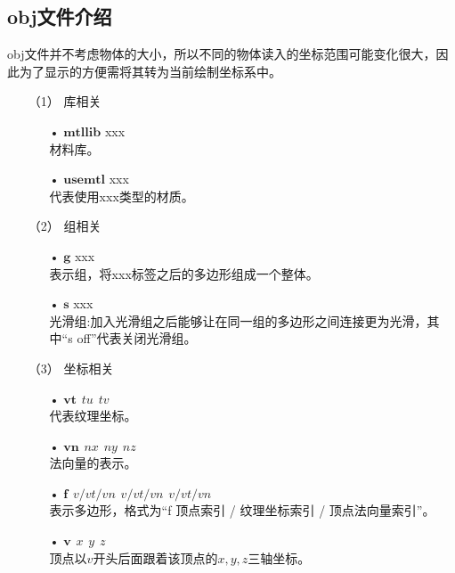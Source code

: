 \documentclass[10pt]{article}
\begin{document}
\subsection{obj文件介绍}
obj文件并不考虑物体的大小，所以不同的物体读入的坐标范围可能变化很大，因此为了显示的方便需将其转为当前绘制坐标系中。
\begin{itemize}
\item[（1）]{库相关}
\begin{itemize}
\item[•]{$\bm{mtllib}$ xxx} \mbox{} \\
材料库。
\item[•]{$\bm{usemtl}$ xxx} \mbox{} \\
代表使用xxx类型的材质。
\end{itemize}

\item[（2）]{组相关} 
\begin{itemize}
\item[•]{$\bm{g}$ xxx} \mbox{} \\
表示组，将xxx标签之后的多边形组成一个整体。
\item[•]{$\bm{s}$ xxx} \mbox{} \\
光滑组:加入光滑组之后能够让在同一组的多边形之间连接更为光滑，其中“s off”代表关闭光滑组。
\end{itemize}

\item[（3）]{坐标相关}
\begin{itemize}
\item[•]{$\bm{vt} \hspace{5pt}tu \hspace{5pt} tv$} \mbox{} \\
代表纹理坐标。
\item[•]{$\bm{vn} \hspace{5pt} nx \hspace{5pt} ny \hspace{5pt} nz$} \mbox{} \\
法向量的表示。
\item[•]{$\bm{f} \hspace{5pt} v/vt/vn \hspace{5pt} v/vt/vn \hspace{5pt} v/vt/vn$}\mbox{} \\
表示多边形，格式为“f 顶点索引 / 纹理坐标索引 / 顶点法向量索引”。
\item[•]{$\bm{v} \hspace{5pt} x\hspace{5pt}y\hspace{5pt}z$} \mbox{} \\
顶点以$v$开头后面跟着该顶点的$x,y,z$三轴坐标。
\end{itemize}

\end{itemize}
\end{document}
